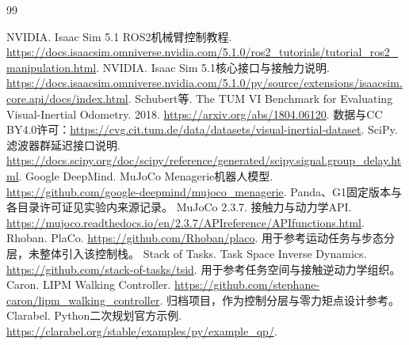 \begin{thebibliography}{99}
 NVIDIA. Isaac Sim 5.1 ROS2机械臂控制教程. \url{https://docs.isaacsim.omniverse.nvidia.com/5.1.0/ros2_tutorials/tutorial_ros2_manipulation.html}.
 NVIDIA. Isaac Sim 5.1核心接口与接触力说明. \url{https://docs.isaacsim.omniverse.nvidia.com/5.1.0/py/source/extensions/isaacsim.core.api/docs/index.html}.
 Schubert等. The TUM VI Benchmark for Evaluating Visual-Inertial Odometry. 2018. \url{https://arxiv.org/abs/1804.06120}. 数据与CC BY4.0许可：\url{https://cvg.cit.tum.de/data/datasets/visual-inertial-dataset}.
 SciPy. 滤波器群延迟接口说明. \url{https://docs.scipy.org/doc/scipy/reference/generated/scipy.signal.group_delay.html}.
 Google DeepMind. MuJoCo Menagerie机器人模型. \url{https://github.com/google-deepmind/mujoco_menagerie}. Panda、G1固定版本与各目录许可证见实验内来源记录。
 MuJoCo 2.3.7. 接触力与动力学API. \url{https://mujoco.readthedocs.io/en/2.3.7/APIreference/APIfunctions.html}.
 Rhoban. PlaCo. \url{https://github.com/Rhoban/placo}. 用于参考运动任务与步态分层，未整体引入该控制栈。
 Stack of Tasks. Task Space Inverse Dynamics. \url{https://github.com/stack-of-tasks/tsid}. 用于参考任务空间与接触逆动力学组织。
 Caron. LIPM Walking Controller. \url{https://github.com/stephane-caron/lipm_walking_controller}. 归档项目，作为控制分层与零力矩点设计参考。
 Clarabel. Python二次规划官方示例. \url{https://clarabel.org/stable/examples/py/example_qp/}.
\end{thebibliography}
